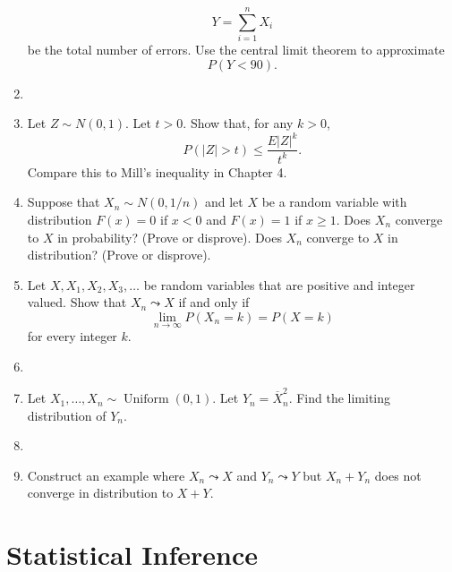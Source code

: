 \documentclass{article}
\begin{document}
\begin{enumerate}
	$$
	Y = \sum_{i = 1}^n X_i
	$$
	be the total number of errors. Use the central limit theorem to approximate
	$$
	P(Y < 90).
	$$
	\item
	\item Let $Z \sim N(0, 1)$. Let $t > 0$. Show that, for any $k > 0$,
	$$
	P(|Z| > t) \leq \frac{E|Z|^k}{t^k}.
	$$
	Compare this to Mill's inequality in Chapter 4.
	\item Suppose that $X_n \sim N(0, 1/n)$ and let $X$ be a random variable with distribution $F(x) = 0$ if $x < 0$ and $F(x) = 1$ if $x \geq 1$. Does $X_n$ converge to $X$ in probability? (Prove or disprove). Does $X_n$ converge to $X$ in distribution? (Prove or disprove).
	\item Let $X, X_1, X_2, X_3, \dots$ be random variables that are positive and integer valued. Show that $X_n \leadsto X$ if and only if
	$$
	\lim_{n \rightarrow \infty} P(X_n = k) = P(X = k)
	$$
	for every integer $k$.
	\item
	\item Let $X_1, \dots, X_n \sim \operatorname{Uniform}(0, 1)$. Let $Y_n = \overline{X}_n^2$. Find the limiting distribution of $Y_n$.
	\item
	\item Construct an example where $X_n \leadsto X$ and $Y_n \leadsto Y$ but $X_n + Y_n$ does not converge in distribution to $X + Y$.
\end{enumerate}

\section{Statistical Inference}
\end{document}
